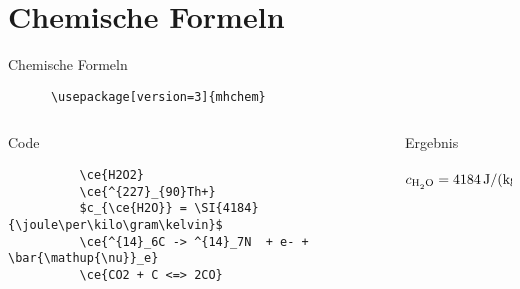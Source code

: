 \section{Chemische Formeln}
\begin{frame}[fragile]{Chemische Formeln}
  \begin{Packages}
    \begin{lstlisting}
      \usepackage[version=3]{mhchem}
    \end{lstlisting}
  \end{Packages}
  \begin{columns}[onlytextwidth, t]
    \begin{column}{0.51\textwidth}
      \begin{block}{Code}
        \begin{lstlisting}
          \ce{H2O2}
          \ce{^{227}_{90}Th+}
          $c_{\ce{H2O}} = \SI{4184}{\joule\per\kilo\gram\kelvin}$
          \ce{^{14}_6C -> ^{14}_7N  + e- + \bar{\mathup{\nu}}_e}
          \ce{CO2 + C <=> 2CO}
        \end{lstlisting}
      \end{block}
    \end{column}
    \begin{column}{0.45\textwidth}
      \linespread{1.3}
      \begin{block}{Ergebnis}
         \\
         \\
        $c_{\ce{H2O}} = \SI{4184}{\joule\per\kilo\gram\per\kelvin}$ \\[0.3\baselineskip]
         \\[0.3\baselineskip]
      \end{block}
    \end{column}
  \end{columns}
\end{frame}

